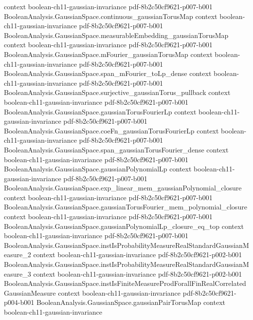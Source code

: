 \begin{lemma}
  {context}
  {boolean-ch11-gaussian-invariance}
  {pdf-8b2c50cf9621-p007-b001}
\proofstep
  {BooleanAnalysis.GaussianSpace.continuous_gaussianTorusMap}
  {context}
  {boolean-ch11-gaussian-invariance}
  {pdf-8b2c50cf9621-p007-b001}
\proofstep
  {BooleanAnalysis.GaussianSpace.measurableEmbedding_gaussianTorusMap}
  {context}
  {boolean-ch11-gaussian-invariance}
  {pdf-8b2c50cf9621-p007-b001}
\proofstep
  {BooleanAnalysis.GaussianSpace.mFourier_gaussianTorusMap}
  {context}
  {boolean-ch11-gaussian-invariance}
  {pdf-8b2c50cf9621-p007-b001}
\proofstep
  {BooleanAnalysis.GaussianSpace.span_mFourier_toLp_dense}
  {context}
  {boolean-ch11-gaussian-invariance}
  {pdf-8b2c50cf9621-p007-b001}
\proofstep
  {BooleanAnalysis.GaussianSpace.surjective_gaussianTorus_pullback}
  {context}
  {boolean-ch11-gaussian-invariance}
  {pdf-8b2c50cf9621-p007-b001}
\proofstep
  {BooleanAnalysis.GaussianSpace.gaussianTorusFourierLp}
  {context}
  {boolean-ch11-gaussian-invariance}
  {pdf-8b2c50cf9621-p007-b001}
\proofstep
  {BooleanAnalysis.GaussianSpace.coeFn_gaussianTorusFourierLp}
  {context}
  {boolean-ch11-gaussian-invariance}
  {pdf-8b2c50cf9621-p007-b001}
\proofstep
  {BooleanAnalysis.GaussianSpace.span_gaussianTorusFourier_dense}
  {context}
  {boolean-ch11-gaussian-invariance}
  {pdf-8b2c50cf9621-p007-b001}
\proofstep
  {BooleanAnalysis.GaussianSpace.gaussianPolynomialLp}
  {context}
  {boolean-ch11-gaussian-invariance}
  {pdf-8b2c50cf9621-p007-b001}
\proofstep
  {BooleanAnalysis.GaussianSpace.exp_linear_mem_gaussianPolynomial_closure}
  {context}
  {boolean-ch11-gaussian-invariance}
  {pdf-8b2c50cf9621-p007-b001}
\proofstep
  {BooleanAnalysis.GaussianSpace.gaussianTorusFourier_mem_polynomial_closure}
  {context}
  {boolean-ch11-gaussian-invariance}
  {pdf-8b2c50cf9621-p007-b001}
\proofstep
  {BooleanAnalysis.GaussianSpace.gaussianPolynomialLp_closure_eq_top}
  {context}
  {boolean-ch11-gaussian-invariance}
  {pdf-8b2c50cf9621-p007-b001}
\proofstep
  {BooleanAnalysis.GaussianSpace.instIsProbabilityMeasureRealStandardGaussianMeasure_2}
  {context}
  {boolean-ch11-gaussian-invariance}
  {pdf-8b2c50cf9621-p002-b001}
\proofstep
  {BooleanAnalysis.GaussianSpace.instIsProbabilityMeasureRealStandardGaussianMeasure_3}
  {context}
  {boolean-ch11-gaussian-invariance}
  {pdf-8b2c50cf9621-p002-b001}
\proofstep
  {BooleanAnalysis.GaussianSpace.instIsFiniteMeasureProdForallFinRealCorrelatedGaussianMeasure}
  {context}
  {boolean-ch11-gaussian-invariance}
  {pdf-8b2c50cf9621-p004-b001}
\proofstep
  {BooleanAnalysis.GaussianSpace.gaussianPairTorusMap}
  {context}
  {boolean-ch11-gaussian-invariance}

\end{lemma}
